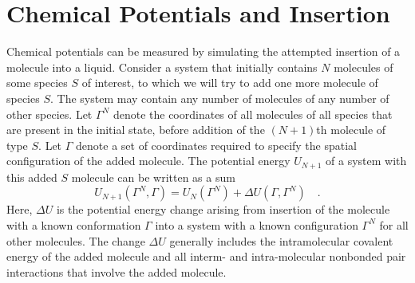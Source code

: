 \documentclass[12pt]{article} %
\newcommand\system{\Gamma^{N}}
\newcommand\chain{\Gamma}
\newcommand\Utot{U_{N+1}}
\newcommand\Usys{U_{N}}
\newcommand\delU{\Delta U}
\begin{document}




\section{Chemical Potentials and Insertion}
Chemical potentials can be measured by simulating the attempted insertion of a molecule into a liquid.  Consider a system that initially contains $N$ molecules of some species $S$ of interest, to which we will try to add one more molecule of species $S$. The system may contain any number of molecules of any number of other species. Let $\system$ denote the coordinates of all molecules of all species that are present in the initial state, before addition of the $(N+1)$th molecule of type $S$. Let $\chain$ denote a set of coordinates required to specify the spatial configuration of the added molecule. The potential energy $\Utot$ of a system with this added $S$ molecule can be written as a sum 
\begin{equation}
    \Utot(\system, \chain) = \Usys(\system) + \delU (\chain, \system) 
    \quad.
\end{equation}
Here, $\delU$ is the potential energy change arising from insertion of the molecule with a known conformation $\chain$ into a system with a known configuration $\system$ for all other molecules. The change $\delU$ generally includes the intramolecular covalent energy of the added molecule and all interm- and intra-molecular nonbonded pair interactions that involve the added molecule. 
\end{document}
